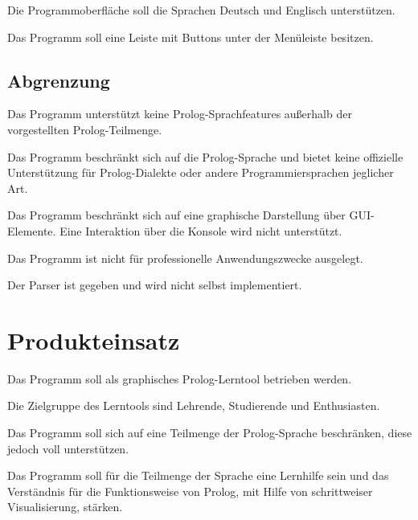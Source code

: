 \documentclass[parskip=full,11pt,twoside]{scrartcl}
\begin{document}

Die Programmoberfläche soll die Sprachen Deutsch und Englisch unterstützen.


Das Programm soll eine Leiste mit Buttons unter der Menüleiste besitzen.

\subsection{Abgrenzung}


Das Programm unterstützt keine Prolog-Sprachfeatures außerhalb der vorgestellten Prolog-Teilmenge.


Das Programm beschränkt sich auf die Prolog-Sprache und bietet keine offizielle Unterstützung für Prolog-Dialekte oder andere Programmiersprachen jeglicher Art.


Das Programm beschränkt sich auf eine graphische Darstellung über GUI-Elemente. Eine Interaktion über die Konsole wird nicht unterstützt.


Das Programm ist nicht für professionelle Anwendungszwecke ausgelegt.


Der Parser ist gegeben und wird nicht selbst implementiert.

\section{Produkteinsatz}

Das Programm soll als graphisches Prolog-Lerntool betrieben werden.

Die Zielgruppe des Lerntools sind Lehrende, Studierende und Enthusiasten.

Das Programm soll sich auf eine Teilmenge der Prolog-Sprache beschränken, diese jedoch voll unterstützen.

Das Programm soll für die Teilmenge der Sprache eine Lernhilfe sein und das Verständnis für die Funktionsweise von Prolog, mit Hilfe von schrittweiser Visualisierung, stärken.
\end{document}
